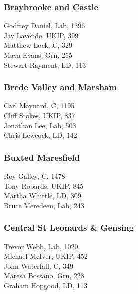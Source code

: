 \documentclass[a4paper,openany,10pt]{book}
\begin{document}
\subsubsection*{Braybrooke and Castle}



Godfrey Daniel, Lab, 1396\\
Jay Lavende, UKIP, 399\\
Matthew Lock, C, 329\\
Maya Evans, Grn, 255\\
Stewart Rayment, LD, 113\\


\subsubsection*{Brede Valley and Marsham}



Carl Maynard, C, 1195\\
Cliff Stokes, UKIP, 837\\
Jonathan Lee, Lab, 503\\
Chris Lewcock, LD, 142\\


\subsubsection*{Buxted Maresfield}



Roy Galley, C, 1478\\
Tony Robards, UKIP, 845\\
Martha Whittle, LD, 309\\
Bruce Meredeen, Lab, 243\\


\subsubsection*{Central St Leonards \& Gensing}



Trevor Webb, Lab, 1020\\
Michael McIver, UKIP, 452\\
John Waterfall, C, 349\\
Maresa Bossano, Grn, 228\\
Graham Hopgood, LD, 113\\
\end{document}
